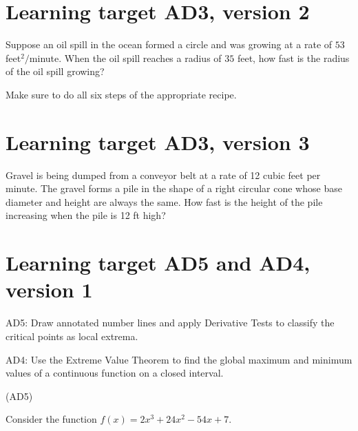 \pagebreak

\section{Learning target AD3, version 2}

Suppose an oil spill in the ocean formed a circle and was growing at a rate of \(53\) feet\(^2/\)minute. When the oil spill reaches a radius of \(35\) feet, how fast is the radius of the oil spill growing? 

\vspace{1em}

Make sure to do all six steps of the appropriate recipe.


\pagebreak
\section{Learning target AD3, version 3}


Gravel is being dumped from a conveyor belt at a rate of 12 cubic feet per minute. The gravel forms a pile in the shape of a right circular cone whose base diameter and height are always the same. How fast is the height of the pile increasing when the pile is 12 ft high? 
\pagebreak

\section{Learning target AD5 and AD4, version 1}

AD5: Draw annotated number lines and apply Derivative Tests to classify the critical points as local extrema.

AD4: Use the Extreme Value Theorem to find the global maximum and minimum values of a continuous function on a closed interval.

\hrulefill (AD5)

Consider the function
\(f(x)=2x^{3}+24x^{2}-54x+7\).
	
